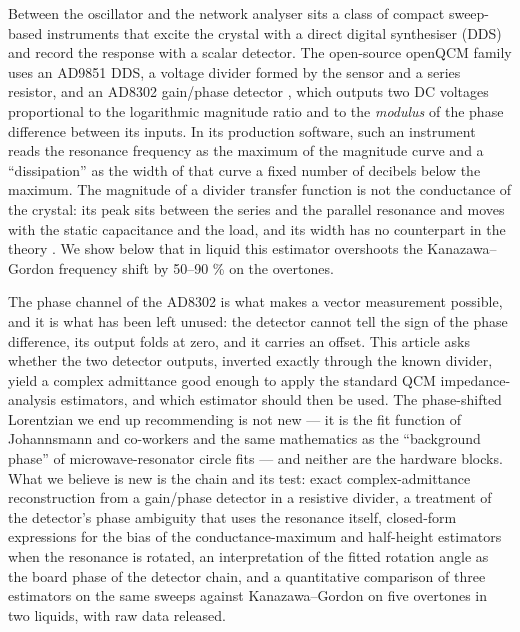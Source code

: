 \documentclass[11pt,a4paper]{article}
\begin{document}
Between the oscillator and the network analyser sits a class of compact
sweep-based instruments that excite the crystal with a direct digital
synthesiser (DDS) and record the response with a scalar detector. The
open-source openQCM family
\citep{openQCMQ1, openQCMNEXT, Horst2022, Munoz2023} uses an AD9851 DDS,
a voltage divider formed by the sensor and a series resistor, and an
AD8302 gain/phase detector \citep{AD8302Datasheet}, which outputs two DC
voltages proportional to the logarithmic magnitude ratio and to the
\emph{modulus} of the phase difference between its inputs. In its
production software, such an instrument reads the resonance frequency as
the maximum of the magnitude curve and a ``dissipation'' as the width of
that curve a fixed number of decibels below the maximum. The magnitude
of a divider transfer function is not the conductance of the crystal:
its peak sits between the series and the parallel resonance and moves
with the static capacitance and the load, and its width has no
counterpart in the theory \citep{Johannsmann2021}. We show below that in
liquid this estimator overshoots the Kanazawa--Gordon frequency shift by
50--90 \% on the overtones.

The phase channel of the AD8302 is what makes a vector measurement
possible, and it is what has been left unused: the detector cannot tell
the sign of the phase difference, its output folds at zero, and it
carries an offset. This article asks whether the two detector outputs,
inverted exactly through the known divider, yield a complex admittance
good enough to apply the standard QCM impedance-analysis estimators, and
which estimator should then be used. The phase-shifted Lorentzian we end
up recommending is not new --- it is the fit function of Johannsmann and
co-workers \citep{Johannsmann2021, Leppin2020, JohannsmannReviakine2024}
and the same mathematics as the ``background phase'' of
microwave-resonator circle fits
\citep{KajfezHwan1984, PetersanAnlage1998, Khalil2012, Probst2015} ---
and neither are the hardware blocks. What we believe is new is the chain
and its test: exact complex-admittance reconstruction from a gain/phase
detector in a resistive divider, a treatment of the detector's phase
ambiguity that uses the resonance itself, closed-form expressions for
the bias of the conductance-maximum and half-height estimators when the
resonance is rotated, an interpretation of the fitted rotation angle as
the board phase of the detector chain, and a quantitative comparison of
three estimators on the same sweeps against Kanazawa--Gordon on five
overtones in two liquids, with raw data released.
\end{document}
